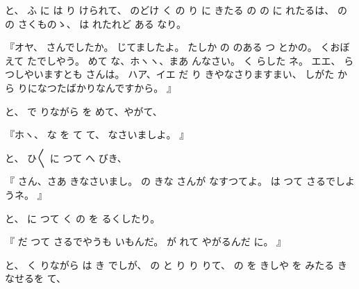 と、
ふ
に
は
り
けられて、
のどけ
く
の
り
に
きたる
の
の
に
れたるは、
の
の
さくものゝ、
は
れたれど
ある
なり。

『オヤ、
さんでしたか。
じてましたよ。
たしか
の
のある
つ
とかの。
くおぼえて
たでしやう。
めて
な、ホヽヽ、まあ
んなさい。
く
らした
ネ。
エエ、
らつしやいますとも
さんは。
ハア、イエ
だ
り
きやなさりますまい、
しがた
から
りになつたばかりなんですから。
』

と、
で
りながら
を
めて、やがて、

『ホヽ、
な
を
て
て、
なさいましよ。
』

と、
ひ〳〵
に
つて
へ
びき、

『
さん、さあ
きなさいまし。
の
きな
さんが
なすつてよ。
は
つて
さるでしようネ。
』

と、
に
つて
く
の
を
るくしたり。

『
だ
つて
さるでやうも
いもんだ。
が
れて
やがるんだ
に。
』

と、
く
りながら
は
き
でしが、
の
と
り
り
りて、
の
を
きしや
を
みたる
き
なせるを
て、

